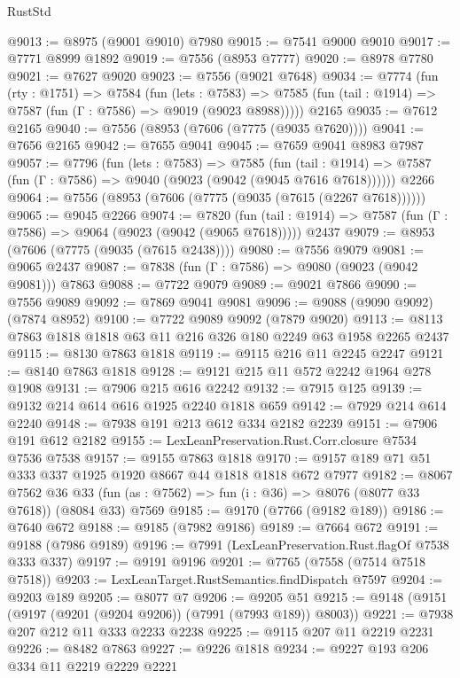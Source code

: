 \begin{lexlean}{RustStd}
\begin{coremodule}
@9013 := @8975 (@9001 @9010) @7980
@9015 := @7541 @9000 @9010
@9017 := @7771 @8999 @1892
@9019 := @7556 (@8953 @7777)
@9020 := @8978 @7780
@9021 := @7627 @9020
@9023 := @7556 (@9021 @7648)
@9034 := @7774
    (fun (rty : @1751) =>
    @7584
      (fun (lets : @7583) =>
      @7585 (fun (tail : @1914) => @7587 (fun (Γ : @7586) => @9019 (@9023 @8988)))))
    @2165
@9035 := @7612 @2165
@9040 := @7556 (@8953 (@7606 (@7775 (@9035 @7620))))
@9041 := @7656 @2165
@9042 := @7655 @9041
@9045 := @7659 @9041 @8983 @7987
@9057 := @7796
    (fun (lets : @7583) =>
    @7585
      (fun (tail : @1914) => @7587 (fun (Γ : @7586) => @9040 (@9023 (@9042 (@9045 @7616 @7618))))))
    @2266
@9064 := @7556 (@8953 (@7606 (@7775 (@9035 (@7615 (@2267 @7618))))))
@9065 := @9045 @2266
@9074 := @7820
    (fun (tail : @1914) => @7587 (fun (Γ : @7586) => @9064 (@9023 (@9042 (@9065 @7618)))))
    @2437
@9079 := @8953 (@7606 (@7775 (@9035 (@7615 @2438))))
@9080 := @7556 @9079
@9081 := @9065 @2437
@9087 := @7838 (fun (Γ : @7586) => @9080 (@9023 (@9042 @9081))) @7863
@9088 := @7722 @9079
@9089 := @9021 @7866
@9090 := @7556 @9089
@9092 := @7869 @9041 @9081
@9096 := @9088 (@9090 @9092) (@7874 @8952)
@9100 := @7722 @9089 @9092 (@7879 @9020)
@9113 := @8113 @7863 @1818 @1818 @63 @11 @216 @326 @180 @2249 @63 @1958 @2265 @2437
@9115 := @8130 @7863 @1818
@9119 := @9115 @216 @11 @2245 @2247
@9121 := @8140 @7863 @1818
@9128 := @9121 @215 @11 @572 @2242 @1964 @278 @1908
@9131 := @7906 @215 @616 @2242
@9132 := @7915 @125
@9139 := @9132 @214 @614 @616 @1925 @2240 @1818 @659
@9142 := @7929 @214 @614 @2240
@9148 := @7938 @191 @213 @612 @334 @2182 @2239
@9151 := @7906 @191 @612 @2182
@9155 := LexLeanPreservation.Rust.Corr.closure @7534 @7536 @7538
@9157 := @9155 @7863 @1818
@9170 := @9157 @189 @71 @51 @333 @337 @1925 @1920 @8667 @44 @1818 @1818 @672 @7977
@9182 := @8067
    @7562
    @36
    @33
    (fun (as : @7562) => fun (i : @36) => @8076 (@8077 @33 @7618))
    (@8084 @33)
    @7569
@9185 := @9170 (@7766 (@9182 @189))
@9186 := @7640 @672
@9188 := @9185 (@7982 @9186)
@9189 := @7664 @672
@9191 := @9188 (@7986 @9189)
@9196 := @7991 (LexLeanPreservation.Rust.flagOf @7538 @333 @337)
@9197 := @9191 @9196
@9201 := @7765 (@7558 (@7514 @7518 @7518))
@9203 := LexLeanTarget.RustSemantics.findDispatch @7597
@9204 := @9203 @189
@9205 := @8077 @7
@9206 := @9205 @51
@9215 := @9148 (@9151 (@9197 (@9201 (@9204 @9206)) (@7991 (@7993 @189)) @8003))
@9221 := @7938 @207 @212 @11 @333 @2233 @2238
@9225 := @9115 @207 @11 @2219 @2231
@9226 := @8482 @7863
@9227 := @9226 @1818
@9234 := @9227 @193 @206 @334 @11 @2219 @2229 @2221

\end{coremodule}
\end{lexlean}
